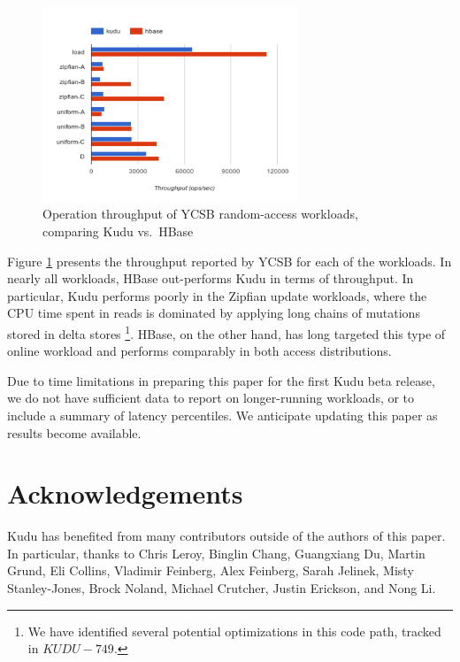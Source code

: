 \documentclass{vldb}
\begin{document}
\begin{figure}
  \includegraphics[width=3in]{ycsb-results.pdf}
  \caption{Operation throughput of YCSB random-access workloads, comparing Kudu vs.\ HBase}
  \label{fig:ycsb_throughput}
\end{figure}

Figure \ref{fig:ycsb_throughput} presents the throughput reported by YCSB for each of the
workloads. In nearly all workloads, HBase out-performs Kudu in terms of throughput. In
particular, Kudu performs poorly in the Zipfian update workloads, where the CPU time
spent in reads is dominated by applying long chains of mutations stored in delta stores
\footnote{We have identified several potential optimizations in this code path, tracked
in $KUDU-749$.}. HBase, on the other hand, has long targeted this type of online workload
and performs comparably in both access distributions.

Due to time limitations in preparing this paper for the first Kudu beta release, we do
not have sufficient data to report on longer-running workloads, or to include a summary
of latency percentiles. We anticipate updating this paper as results become available.


\section{Acknowledgements}
Kudu has benefited from many contributors outside of the authors of this paper. In particular, thanks to Chris Leroy, Binglin Chang, Guangxiang Du, Martin Grund, Eli Collins, Vladimir Feinberg, Alex Feinberg, Sarah Jelinek, Misty Stanley-Jones, Brock Noland, Michael Crutcher, Justin Erickson, and Nong Li.



\end{document}
